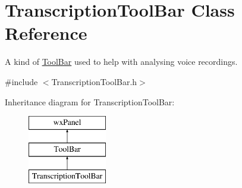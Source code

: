 \hypertarget{class_transcription_tool_bar}{}\section{Transcription\+Tool\+Bar Class Reference}
\label{class_transcription_tool_bar}


A kind of \hyperlink{class_tool_bar}{Tool\+Bar} used to help with analysing voice recordings.  




{\ttfamily \#include $<$Transcription\+Tool\+Bar.\+h$>$}

Inheritance diagram for Transcription\+Tool\+Bar\+:\begin{figure}[H]
\begin{center}
\leavevmode
\includegraphics[height=3.000000cm]{class_transcription_tool_bar}
\end{center}
\end{figure}
